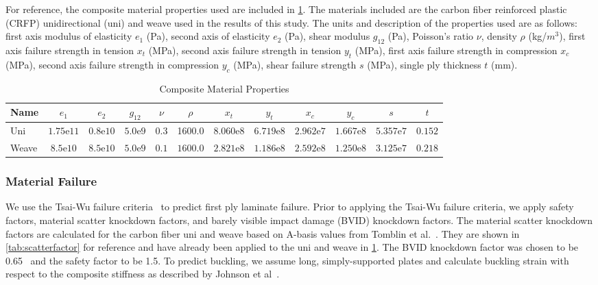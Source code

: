 \documentclass[conf]{new-aiaa}
\begin{document}
For reference, the composite material properties used are included in \cref{tab:matprop}. The materials included are the carbon fiber reinforced plastic (CRFP) unidirectional (uni) and weave used in the results of this study. The units and description of the properties used are as follows: first axis modulus of elasticity $e_1$ (Pa), second axis of elasticity $e_2$ (Pa), shear modulus $g_{12}$ (Pa), Poisson's ratio $\nu$, density $\rho$ (kg/$m^3$), first axis failure strength in tension $x_t$ (MPa), second axis failure strength in tension $y_t$ (MPa), first axis failure strength in compression $x_c$ (MPa), second axis failure strength in compression $y_c$ (MPa), shear failure strength $s$ (MPa), single ply thickness $t$ (mm).\\

\setlength{\tabcolsep}{6pt}
\begin{table}[htbp]
    \begin{center}
        \caption{Composite Material Properties}
        \label{tab:matprop}
        \begin{tabular}{lccccccccccc}%
            \textbf{Name} & \textbf{$e_1$} & \textbf{$e_2$} & \textbf{$g_{12}$} & \textbf{$\nu$} & \textbf{$\rho$} & \textbf{$x_t$} & \textbf{$y_t$} & \textbf{$x_c$} & \textbf{$y_c$} & \textbf{$s$} & \textbf{$t$} \\
            \midrule
            Uni & $1.75$e$11$ & $0.8$e$10$ & $5.0$e$9$ & 0.3 & 1600.0 & $8.060$e$8$ & $6.719$e$8$ & $2.962$e$7$ & $1.667$e$8$ & $5.357$e$7$ & $0.152$ \\
            Weave & $8.5$e$10$ & $8.5$e$10$ & $5.0$e$9$ & $0.1$ & $1600.0$ & $2.821$e$8$ & $1.186$e$8$ & $2.592$e$8$ & $1.250$e$8$ & $3.125$e$7$ & $0.218$ \\

        \end{tabular}
    \end{center}
    \vspace{-12pt}
\end{table}


\subsubsection{Material Failure}

We use the Tsai-Wu failure criteria~\cite{Tsai:1971aa} to predict first ply laminate failure. Prior to applying the Tsai-Wu failure criteria, we apply safety factors, material scatter knockdown factors, and barely visible impact damage (BVID) knockdown factors. The material scatter knockdown factors are calculated for the carbon fiber uni and weave based on A-basis values from Tomblin et al.~\cite{tomblin:2002aa,tomblin:2002ab}. They are shown in \cref{tab:scatterfactor} for reference and have already been applied to the uni and weave in \cref{tab:matprop}. The BVID knockdown factor was chosen to be 0.65~\cite{Kassapoglou:2013aa} and the safety factor to be 1.5. To predict buckling, we assume long, simply-supported plates and calculate buckling strain with respect to the composite stiffness as described by Johnson et al~\cite{JOHNSON:1994aa}. \\
\end{document}
